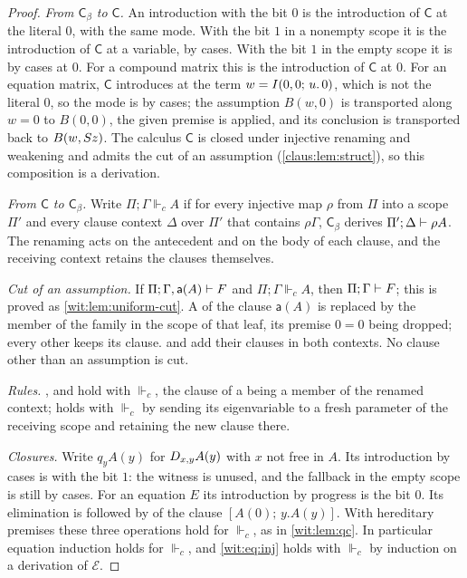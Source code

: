 \begin{proof}
\emph{From $\mathsf{C}_{\beta}$ to $\mathsf{C}$.}  An introduction with the
bit $0$ is the introduction of $\mathsf{C}$ at the literal $0$, with the
same mode.  With the bit $1$ in a nonempty scope it is the introduction of
$\mathsf{C}$ at a variable, by cases.  With the bit $1$ in the empty scope
it is by cases at $0$.  For a compound matrix this is the introduction of
$\mathsf{C}$ at $0$.  For an equation matrix, $\mathsf{C}$ introduces at
the term $w=I(0,0;\,u.\,0)$, which is not the literal $0$, so the mode is
by cases; the assumption $B(w,0)$ is transported along $w=0$ to $B(0,0)$,
the given premise is applied, and its conclusion is transported back to
$B(w,S z)$.  The calculus $\mathsf{C}$ is closed under injective
renaming and weakening and admits the cut of an assumption
(\cref{claus:lem:struct}), so this composition is a derivation.

\emph{From $\mathsf{C}$ to $\mathsf{C}_{\beta}$.}  Write
$\Pi;\Gamma\Vdash_{c}A$ if for every injective map $\rho$ from $\Pi$ into a
scope $\Pi'$ and every clause context $\Delta$ over $\Pi'$ that contains
$\rho\Gamma$, $\mathsf{C}_{\beta}$ derives $\Pi';\Delta\vdash\rho A$.  The
renaming acts on the antecedent and on the body of each clause, and the
receiving context retains the clauses themselves.

\emph{Cut of an assumption.}  If
$\Pi;\Gamma,\mathsf{a}(A)\vdash F$ and $\Pi;\Gamma\Vdash_{c}A$, then
$\Pi;\Gamma\vdash F$; this is proved as \cref{wit:lem:uniform-cut}.  A
 of the clause $\mathsf{a}(A)$ is replaced by the member of
the family in the scope of that leaf, its premise $0=0$ being dropped; every
other  keeps its clause.   and
 add their clauses in both contexts.  No clause other
than an assumption is cut.

\emph{Rules.}  ,  and  hold
with $\Vdash_{c}$, the clause of a  being a member of the
renamed context;  holds with $\Vdash_{c}$ by sending its
eigenvariable to a fresh parameter of the receiving scope and retaining the
new clause there.

\emph{Closures.}  Write $q_yA(y)$ for $D_{x,y}A(y)$ with $x$ not free in
$A$.  Its introduction by cases is  with the bit $1$:
the witness is unused, and the fallback in the empty scope is still by
cases.  For an equation $E$ its introduction by progress is the bit $0$.
Its elimination is  followed by  of the clause
$[A(0);\,y.A(y)]$.  With hereditary premises these three operations hold
for $\Vdash_{c}$, as in \cref{wit:lem:qc}.  In particular equation
induction holds for $\Vdash_{c}$, and \eqref{wit:eq:inj} holds with
$\Vdash_{c}$ by induction on a derivation of $\mathcal E$.


\end{proof}
